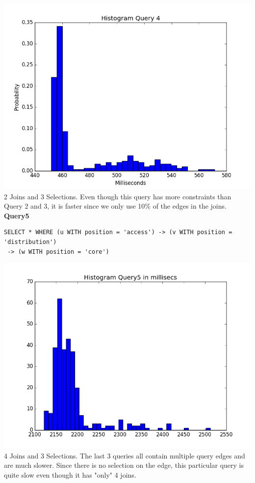 \documentclass[11pt,singlecolumn]{scrartcl}
\begin{document}
\includegraphics[width=1\textwidth]{q42}
2 Joins and 3 Selections. Even though this query has more constraints than Query 2 and 3, it is faster since we only use 10\% of the edges in the joins. 
\clearpage
\textbf{Query5}\\
\begin{verbatim}
SELECT * WHERE (u WITH position = 'access') -> (v WITH position = 'distribution')
 -> (w WITH position = 'core')\end{verbatim}
\includegraphics[width=1\textwidth]{q5}
4 Joins and 3 Selections. The last 3 queries all contain multiple query edges and are much slower. Since there is no selection on the edge, this particular query is quite slow even though it has "only" 4 joins.
\end{document}
